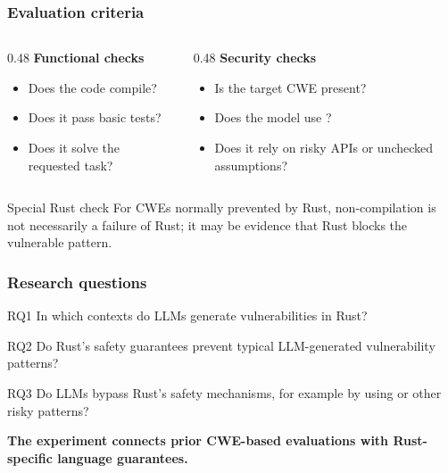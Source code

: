 
\begin{frame}
\frametitle{Evaluation criteria}

\begin{columns}[T]
\begin{column}{0.48\textwidth}
\textbf{Functional checks}
\begin{itemize}
    \item Does the code compile?
    \item Does it pass basic tests?
    \item Does it solve the requested task?
\end{itemize}
\end{column}

\begin{column}{0.48\textwidth}
\textbf{Security checks}
\begin{itemize}
    \item Is the target CWE present?
    \item Does the model use ?
    \item Does it rely on risky APIs or unchecked assumptions?
\end{itemize}
\end{column}
\end{columns}

\bigskip

\begin{alertblock}{Special Rust check}
For CWEs normally prevented by Rust, non-compilation is not necessarily a failure of Rust; it may be evidence that Rust blocks the vulnerable pattern.
\end{alertblock}

\end{frame}


\begin{frame}
\frametitle{Research questions}

\begin{block}{RQ1}
In which contexts do LLMs generate vulnerabilities in Rust?
\end{block}

\begin{block}{RQ2}
Do Rust's safety guarantees prevent typical LLM-generated vulnerability patterns?
\end{block}

\begin{block}{RQ3}
Do LLMs bypass Rust's safety mechanisms, for example by using  or other risky patterns?
\end{block}

\bigskip
\centering
\textbf{The experiment connects prior CWE-based evaluations with Rust-specific language guarantees.}

\end{frame}

